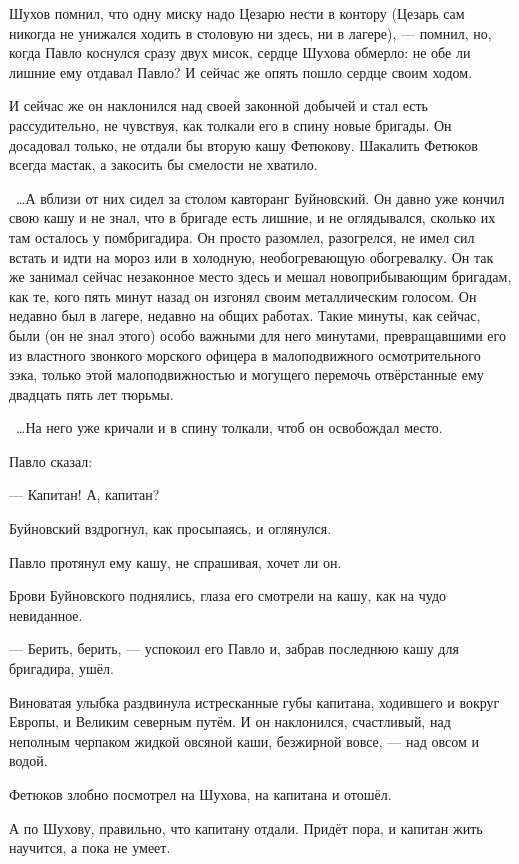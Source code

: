 Шухов помнил, что одну миску надо Цезарю нести в контору (Цезарь сам никогда не унижался 
ходить в столовую ни здесь, ни в лагере), --- помнил, но, когда Павло коснулся сразу двух мисок, 
сердце Шухова обмерло: не обе ли лишние ему отдавал Павло? И сейчас же опять пошло сердце 
своим ходом.

И сейчас же он наклонился над своей законной добычей и стал есть рассудительно, не чувствуя, 
как толкали его в спину новые бригады. Он досадовал только, не отдали бы вторую кашу 
Фетюкову. Шакалить Фетюков всегда мастак, а закосить бы смелости не хватило.

~\dots{}А вблизи от них сидел за столом кавторанг Буйновский. Он давно уже кончил свою кашу и не 
знал, что в бригаде есть лишние, и не оглядывался, сколько их там осталось у помбригадира. Он 
просто разомлел, разогрелся, не имел сил встать и идти на мороз или в холодную, 
необогревающую обогревалку. Он так же занимал сейчас незаконное место здесь и мешал 
новоприбывающим бригадам, как те, кого пять минут назад он изгонял своим металлическим 
голосом. Он недавно был в лагере, недавно на общих работах. Такие минуты, как сейчас, были (он 
не знал этого) особо важными для него минутами, превращавшими его из властного звонкого 
морского офицера в малоподвижного осмотрительного зэка, только этой малоподвижностью и 
могущего перемочь отвёрстанные ему двадцать пять лет тюрьмы.

~\dots{}На него уже кричали и в спину толкали, чтоб он освобождал место.

Павло сказал:

--- Капитан! А, капитан?

Буйновский вздрогнул, как просыпаясь, и оглянулся.

Павло протянул ему кашу, не спрашивая, хочет ли он.

Брови Буйновского поднялись, глаза его смотрели на кашу, как на чудо невиданное.

--- Берить, берить, --- успокоил его Павло и, забрав последнюю кашу для бригадира, ушёл.

Виноватая улыбка раздвинула истресканные губы капитана, ходившего и вокруг Европы, и 
Великим северным путём. И он наклонился, счастливый, над неполным черпаком жидкой овсяной 
каши, безжирной вовсе, --- над овсом и водой.

Фетюков злобно посмотрел на Шухова, на капитана и отошёл.

А по Шухову, правильно, что капитану отдали. Придёт пора, и капитан жить научится, а пока не 
умеет.

